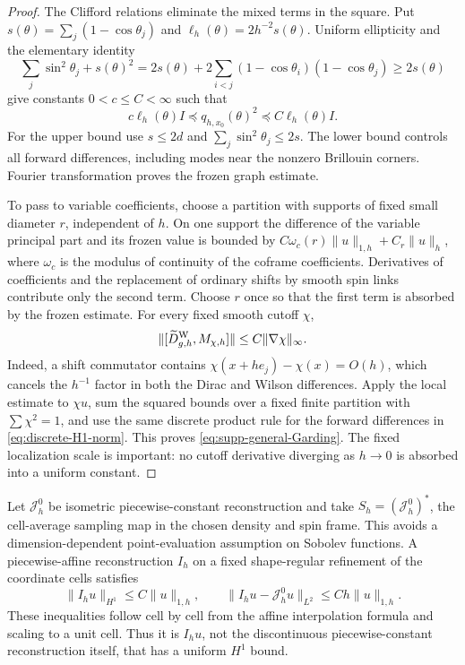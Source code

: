 \documentclass[11pt]{article}
\theoremstyle{definition}
\theoremstyle{remark}
\theoremstyle{definition}
\theoremstyle{remark}
\begin{document}
\begin{proof}
The Clifford relations eliminate the mixed terms in the square.  Put
$s(\theta)=\sum_j(1-\cos\theta_j)$ and
$\ell_h(\theta)=2h^{-2}s(\theta)$.  Uniform ellipticity and the elementary
identity
\[
 \sum_j\sin^2\theta_j+s(\theta)^2
 =2s(\theta)+2\sum_{i<j}(1-\cos\theta_i)(1-\cos\theta_j)
 \ge2s(\theta)
\]
give constants $0<c\le C<\infty$ such that
\begin{equation}
 c\ell_h(\theta)I\preceq q_{h,x_0}(\theta)^2
            \preceq C\ell_h(\theta)I.
 \label{eq:frozen-uniform-ellipticity}
\end{equation}
For the upper bound use $s\le2d$ and $\sum_j\sin^2\theta_j\le2s$.
The lower bound controls all forward differences, including modes near the
nonzero Brillouin corners.  Fourier transformation proves the frozen graph
estimate.

To pass to variable coefficients, choose a partition with supports of fixed
small diameter $r$, independent of $h$.  On one support the difference of the
variable principal part and its frozen value is bounded by
$C\omega_c(r)\|u\|_{1,h}+C_r\|u\|_h$, where $\omega_c$ is the modulus of
continuity of the coframe coefficients.  Derivatives of coefficients and the
replacement of ordinary shifts by smooth spin links contribute only the
second term.  Choose $r$ once so that the first term is absorbed by the frozen
estimate.  For every fixed smooth cutoff $\chi$,
\begin{equation}
 \|[\widetilde D_{g,h}^{\rm W},M_{\chi,h}]\|
          \le C\|\nabla\chi\|_\infty.
 \label{eq:local-cutoff-commutator}
\end{equation}
Indeed, a shift commutator contains $\chi(x+he_j)-\chi(x)=O(h)$,
which cancels the $h^{-1}$ factor in both the Dirac and Wilson differences.
Apply the local estimate to $\chi u$, sum the squared bounds over a fixed
finite partition with $\sum\chi^2=1$, and use the same discrete product rule
for the forward differences in \eqref{eq:discrete-H1-norm}.  This proves
\eqref{eq:supp-general-Garding}.  The fixed localization scale is important:
no cutoff derivative diverging as $h\to0$ is absorbed into a uniform constant.
\end{proof}

Let $\mathcal J_h^0$ be isometric piecewise-constant reconstruction and take
$S_h=(\mathcal J_h^0)^*$, the cell-average sampling map in the chosen density
and spin frame.  This avoids a dimension-dependent point-evaluation assumption
on Sobolev functions.  A piecewise-affine reconstruction $I_h$ on a fixed
shape-regular refinement of the coordinate cells satisfies
\begin{equation}
 \|I_hu\|_{H^1}\le C\|u\|_{1,h},\qquad
 \|I_hu-\mathcal J_h^0u\|_{L^2}\le Ch\|u\|_{1,h}.
 \label{eq:local-reconstruction-estimates}
\end{equation}
These inequalities follow cell by cell from the affine interpolation formula
and scaling to a unit cell.  Thus it is $I_hu$, not the discontinuous
piecewise-constant reconstruction itself, that has a uniform $H^1$ bound.
\end{document}
